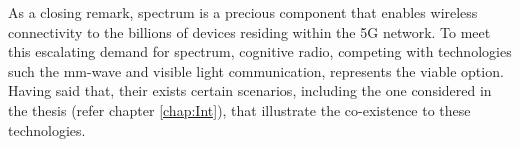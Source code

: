 As a closing remark, spectrum is a precious component that enables wireless connectivity to the billions of devices residing within the 5G network. To meet this escalating demand for spectrum, cognitive radio, competing with technologies such the mm-wave and visible light communication, represents the viable option. Having said that, their exists certain scenarios, including the one considered in the thesis (refer chapter \ref{chap:Int}), that illustrate the co-existence to these technologies. 







